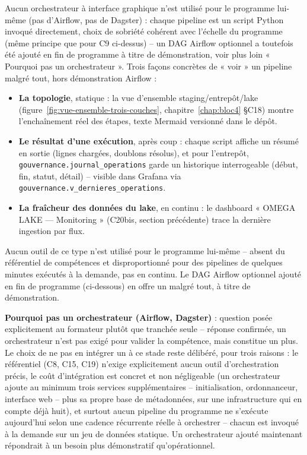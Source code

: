 Aucun orchestrateur à interface graphique n'est utilisé pour le
programme lui-même (pas d'Airflow, pas de Dagster) : chaque pipeline
est un script Python invoqué directement, choix de sobriété cohérent
avec l'échelle du programme (même principe que pour C9 ci-dessus) -- un
DAG Airflow optionnel a toutefois été ajouté en fin de programme à
titre de démonstration, voir plus loin « Pourquoi pas un
orchestrateur ». Trois façons concrètes de « voir » un pipeline malgré
tout, hors démonstration Airflow :
\begin{itemize}
  \item \textbf{La topologie}, statique : la vue d'ensemble
    staging/entrepôt/lake (figure~\ref{fig:vue-ensemble-trois-couches},
    chapitre~\ref{chap:bloc4} §C18) montre l'enchaînement réel des
    étapes, texte Mermaid versionné dans le dépôt.
  \item \textbf{Le résultat d'une exécution}, après coup : chaque script
    affiche un résumé en sortie (lignes chargées, doublons résolus),
    et pour l'entrepôt, \texttt{gouvernance.journal\_operations} garde
    un historique interrogeable (début, fin, statut, détail) -- visible
    dans Grafana via \texttt{gouvernance.v\_dernieres\_operations}.
  \item \textbf{La fraîcheur des données du lake}, en continu : le
    dashboard « OMEGA LAKE --- Monitoring » (C20bis, section
    précédente) trace la dernière ingestion par flux.
\end{itemize}
Aucun outil de ce type n'est utilisé pour le programme lui-même --
absent du référentiel de compétences et disproportionné pour des
pipelines de quelques minutes exécutés à la demande, pas en continu.
Le DAG Airflow optionnel ajouté en fin de programme (ci-dessous) en
offre un malgré tout, à titre de démonstration.

\textbf{Pourquoi pas un orchestrateur (Airflow, Dagster)} : question
posée explicitement au formateur plutôt que tranchée seule -- réponse
confirmée, un orchestrateur n'est pas exigé pour valider la
compétence, mais constitue un plus. Le choix de ne pas en intégrer un
à ce stade reste délibéré, pour trois raisons : le référentiel (C8,
C15, C19) n'exige explicitement aucun outil d'orchestration précis, le
coût d'intégration est concret et non négligeable (un orchestrateur
ajoute au minimum trois services supplémentaires -- initialisation,
ordonnanceur, interface web -- plus sa propre base de métadonnées, sur
une infrastructure qui en compte déjà huit), et surtout aucun pipeline
du programme ne s'exécute aujourd'hui selon une cadence récurrente
réelle à orchestrer -- chacun est invoqué à la demande sur un jeu de
données statique. Un orchestrateur ajouté maintenant répondrait à un
besoin plus démonstratif qu'opérationnel.


